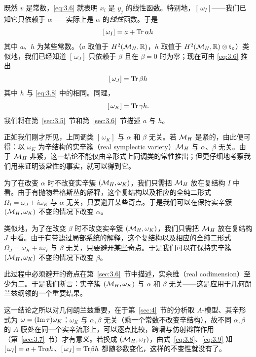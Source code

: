 既然 $v$ 是常数，\eqref{eq:3.6} 就表明 $x_i$ 是 $y_j$ 的线性函数。特别地，$[\,\omega_I]$——我们已知它只依赖于 $\alpha$——实际上是 $\alpha$ 的{\it 线性}函数。于是
\setcounter{equation}{7}
\begin{equation}\label{eq:3.8}
  [\,\omega_I]=a+{\rm Tr}\,\alpha h
\end{equation}
其中 $a$、$h$ 为某些常数。（$a$ 取值于
$H^2({{\mathcal{M}}_H},{\mathbb{R}})$，$h$ 取值于 $H^2({{\mathcal{M}}_H},{\mathbb{R}})\otimes {\mathfrak t}$。）类似地，我们已经知道 $[\,\omega_J]$ 只依赖于 $\beta$
且在 $\beta=0$ 时为零；现在可由 \eqref{eq:3.6} 推出
\setcounter{equation}{8}
\begin{equation}\label{eq:3.9}
  [\,\omega_J]={\rm Tr}\,\beta h
\end{equation}
其中 $h$ 与 \eqref{eq:3.8} 中的相同。同理，
\setcounter{equation}{9}
\begin{equation}\label{eq:3.10}
  [\,\omega_K]={\rm Tr}\,\gamma h.
\end{equation}
我们将在第~\ref{sec:3.5}~节和第~\ref{sec:3.6}~节描述 $a$ 与 $h$。

\bigskip{}

  正如我们刚才所见，上同调类 $[\,\omega_K]$ 与 $\alpha$ 和 $\beta$ 无关。若 ${{\mathcal{M}}_H}$ 是紧的，由此便可得：以 $\omega_K$ 为辛结构的实辛簇（real symplectic variety）${{\mathcal{M}}_H}$ 与 $\alpha$、$\beta$ 无关。由于 ${{\mathcal{M}}_H}$ 非紧，这一结论不能仅由辛形式上同调类的常性推出；但更仔细地考察我们用来证明该常性的事实，就可以得到它。

为了在改变 $\alpha$ 时不改变实辛簇 $({{\mathcal{M}}_H},\omega_K)$，我们只需把 ${{\mathcal{M}}_H}$ 放在复结构 $I$ 中看。由于有抛物希格斯丛的解释，这个复结构以及相应的全纯二形式
$\Omega_I=\omega_J+i\omega_K$ 与 $\alpha$ 无关，只要避开某些奇点。于是我们可以在保持实辛簇
$({{\mathcal{M}}_H},\omega_K)$ 不变的情况下改变 $\alpha$。

类似地，为了在改变 $\beta$ 时不改变实辛簇 $({{\mathcal{M}}_H},\omega_K)$，我们只需把 ${{\mathcal{M}}_H}$ 放在复结构
$J$ 中看。由于有带滤过局部系统的解释，这个复结构以及相应的全纯二形式
$\Omega_J=\omega_K+i\omega_I$ 与 $\beta$ 无关，只要避开某些奇点。于是我们可以在保持实辛簇
$({{\mathcal{M}}_H},\omega_K)$ 不变的情况下改变 $\beta$。

此过程中必须避开的奇点在第~\ref{sec:3.6}~节中描述，实余维（real codimension）至少为二。于是我们断言：实辛簇 $({{\mathcal{M}}_H},\omega_K)$ 与 $\alpha$ 和 $\beta$ 无关——这是应用于几何朗兰兹纲领的一个重要结果。

\begin{yizhu}[物理图像补充]
这一结论之所以对几何朗兰兹重要，在于第~\ref{sec:4}~节的分析取 $A$-模型、其辛形式为 $\omega=({\rm Im}\,\tau)\omega_K$：$\omega_K$ 与 $\alpha,\beta$ 无关（乘一个常数不改变辛结构），故不同 $\alpha,\beta$ 的 $A$-膜处在同一个实辛流形上，可以逐点比较，跨墙与仿射辫群作用（第~\ref{sec:3.7}~节）才有意义。若换成 $({{\mathcal{M}}_H},\omega_I)$，由式~\eqref{eq:3.8}、\eqref{eq:3.9} 知 $[\,\omega_I]=a+{\rm Tr}\alpha h$、$[\,\omega_J]={\rm Tr}\beta h$ 都随参数变化，这样的不变性就没有了。
\end{yizhu}

